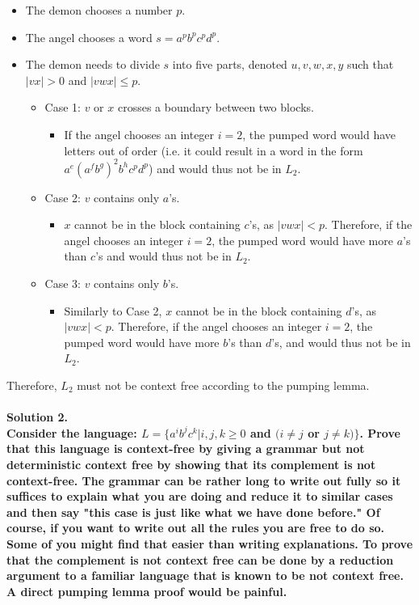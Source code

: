 \documentclass{article}
\begin{document}
\begin{itemize}
    \item The demon chooses a number \(p\).
    \item The angel chooses a word \(s  = a^p b^p c^p d^p\). 
    \item The demon needs to divide \(s\) into five parts, denoted \(u, v, w, x, y\) such that \(|vx|>0\) and \(|vwx|\leq p\).
    \begin{itemize}
        \item Case 1: \(v\) or \(x\) crosses a boundary between two blocks.
        \begin{itemize}
            \item If the angel chooses an integer \(i=2\), the pumped word would have letters out of order (i.e. it could result in a word in the form \(a^e(a^f b^g)^2 b^h c^p d^p\)) and would thus not be in \(L_2\).
        \end{itemize}
        \item Case 2: \(v\) contains only \(a\)'s.
            \begin{itemize}
                \item \(x\) cannot be in the block containing \(c\)'s, as \(|vwx|<p\). Therefore, if the angel chooses an integer \(i=2\), the pumped word would have more \(a\)'s than \(c\)'s and would thus not be in \(L_2\).
            \end{itemize}
        \item Case 3: \(v\) contains only \(b\)'s.
        \begin{itemize}
            \item Similarly to Case 2, \(x\) cannot be in the block containing \(d\)'s, as \(|vwx|<p\). Therefore, if the angel chooses an integer \(i=2\), the pumped word would have more \(b\)'s than \(d\)'s, and would thus not be in \(L_2\).
        \end{itemize}
    \end{itemize}
\end{itemize}
Therefore, \(L_2\) must not be context free according to the pumping lemma.
\\
\\
\noindent \textbf{Solution 2. 
\\Consider the language: \(L=\{a^i b^j c^k | i,j,k \geq 0 \) and \((i \neq j\) or \(j \neq k )\}\). Prove that this language is context-free by giving a grammar but not deterministic context free by showing that its complement is not context-free. The grammar can be rather long to write out fully so it suffices to explain what you are doing and reduce it to similar cases and then say "this case is just like what we have done before." Of course, if you want to write out all the rules you are free to do so. Some of you might find that easier than writing explanations. To prove that the complement is not context free can be done by a reduction argument to a familiar language that is known to be not context free. A direct pumping lemma proof would be painful.}
\end{document}
